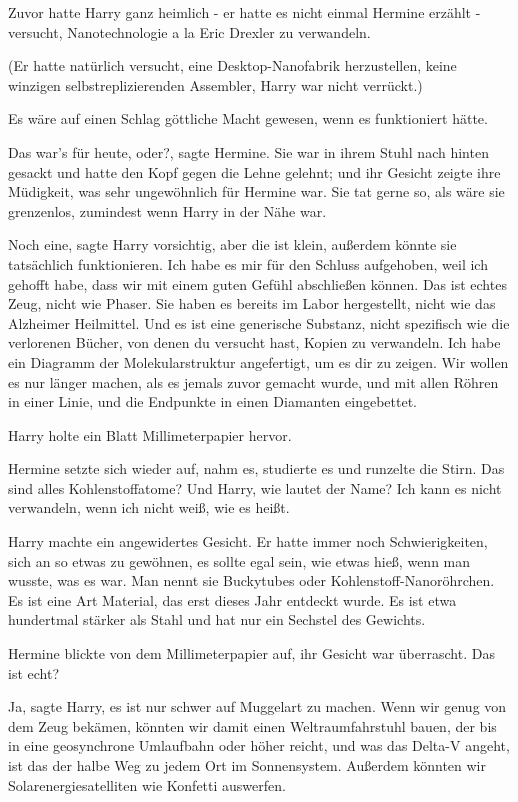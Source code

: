 Zuvor hatte Harry ganz heimlich - er hatte es nicht einmal Hermine erzählt -
versucht, Nanotechnologie a la Eric Drexler zu verwandeln.

(Er hatte natürlich versucht, eine Desktop-Nanofabrik herzustellen, keine
winzigen selbstreplizierenden Assembler, Harry war nicht verrückt.)

Es wäre auf einen Schlag göttliche Macht gewesen, wenn es funktioniert hätte.

\glqq{}Das war's für heute, oder?\grqq{}, sagte Hermine. Sie war in ihrem Stuhl
nach hinten gesackt und hatte den Kopf gegen die Lehne gelehnt; und ihr Gesicht
zeigte ihre Müdigkeit, was sehr ungewöhnlich für Hermine war. Sie tat gerne so,
als wäre sie grenzenlos, zumindest wenn Harry in der Nähe war.

\glqq{}Noch eine\grqq{}, sagte Harry vorsichtig, \glqq{}aber die ist klein,
außerdem könnte sie tatsächlich funktionieren. Ich habe es mir für den Schluss
aufgehoben, weil ich gehofft habe, dass wir mit einem guten Gefühl abschließen
können. Das ist echtes Zeug, nicht wie Phaser. Sie haben es bereits im Labor
hergestellt, nicht wie das Alzheimer Heilmittel. Und es ist eine generische
Substanz, nicht spezifisch wie die verlorenen Bücher, von denen du versucht
hast, Kopien zu verwandeln. Ich habe ein Diagramm der Molekularstruktur
angefertigt, um es dir zu zeigen. Wir wollen es nur länger machen, als es jemals
zuvor gemacht wurde, und mit allen Röhren in einer Linie, und die Endpunkte in
einen Diamanten eingebettet.\grqq{}

Harry holte ein Blatt Millimeterpapier hervor.

Hermine setzte sich wieder auf, nahm es, studierte es und runzelte die Stirn.
\glqq{}Das sind alles Kohlenstoffatome? Und Harry, wie lautet der Name? Ich kann
es nicht verwandeln, wenn ich nicht weiß, wie es heißt.\grqq{}

Harry machte ein angewidertes Gesicht. Er hatte immer noch Schwierigkeiten, sich
an so etwas zu gewöhnen, es sollte egal sein, wie etwas hieß, wenn man wusste,
was es war. \glqq{}Man nennt sie Buckytubes oder Kohlenstoff-Nanoröhrchen. Es ist
eine Art Material, das erst dieses Jahr entdeckt wurde. Es ist etwa hundertmal
stärker als Stahl und hat nur ein Sechstel des Gewichts.\grqq{}

Hermine blickte von dem Millimeterpapier auf, ihr Gesicht war überrascht. \glqq{}
Das ist echt?\grqq{}

\glqq{}Ja\grqq{}, sagte Harry, \glqq{}es ist nur schwer auf Muggelart zu machen.
Wenn wir genug von dem Zeug bekämen, könnten wir damit einen Weltraumfahrstuhl
bauen, der bis in eine geosynchrone Umlaufbahn oder höher reicht, und was das
Delta-V angeht, ist das der halbe Weg zu jedem Ort im Sonnensystem. Außerdem
könnten wir Solarenergiesatelliten wie Konfetti auswerfen.\grqq{}

